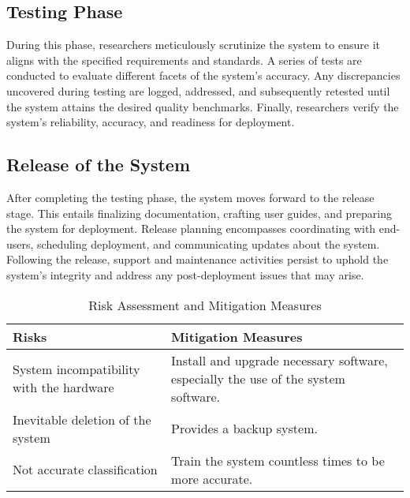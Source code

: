 \documentclass[conference]{IEEEtran}
\begin{document}
    \subsection{Testing Phase}

    During this phase, researchers meticulously scrutinize the system to ensure it aligns with the specified
    requirements and standards. A series of tests are conducted to evaluate different facets of the
    system's accuracy. Any discrepancies uncovered during testing are logged, addressed, and subsequently
    retested until the system attains the desired quality benchmarks. Finally, researchers verify the
    system's reliability, accuracy, and readiness for deployment.

    \subsection{Release of the System}

    After completing the testing phase, the system moves forward to the release stage. This entails
    finalizing documentation, crafting user guides, and preparing the system for deployment. Release
    planning encompasses coordinating with end-users, scheduling deployment, and communicating updates
    about the system. Following the release, support and maintenance activities persist to uphold the
    system's integrity and address any post-deployment issues that may arise.

    \begin{table}
        \begin{tabular}{p{4cm}p{4cm}}
            \textbf{Risks}                           & \textbf{Mitigation Measures}                                                       \\
            \hline
            System incompatibility with the hardware & Install and upgrade necessary software, especially the use of the system software. \\
            \hline
            Inevitable deletion of the system        & Provides a backup system.                                                          \\
            \hline
            Not accurate classification              & Train the system countless times to be more accurate.                              \\
        \end{tabular}
        \caption{Risk Assessment and Mitigation Measures}
    \end{table}
\end{document}
